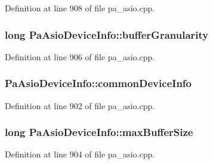 Definition at line 908 of file pa\+\_\+asio.\+cpp.

\subsubsection[{\texorpdfstring{buffer\+Granularity}{bufferGranularity}}]{\setlength{\rightskip}{0pt plus 5cm}long Pa\+Asio\+Device\+Info\+::buffer\+Granularity}\hypertarget{struct_pa_asio_device_info_aedeaec8c670140e8c366561eb0f2e39f}{}\label{struct_pa_asio_device_info_aedeaec8c670140e8c366561eb0f2e39f}


Definition at line 906 of file pa\+\_\+asio.\+cpp.

\subsubsection[{\texorpdfstring{common\+Device\+Info}{commonDeviceInfo}}]{ Pa\+Asio\+Device\+Info\+::common\+Device\+Info}\hypertarget{struct_pa_asio_device_info_ab882b243cb06587235f993247b5651e3}{}\label{struct_pa_asio_device_info_ab882b243cb06587235f993247b5651e3}


Definition at line 902 of file pa\+\_\+asio.\+cpp.

\subsubsection[{\texorpdfstring{max\+Buffer\+Size}{maxBufferSize}}]{\setlength{\rightskip}{0pt plus 5cm}long Pa\+Asio\+Device\+Info\+::max\+Buffer\+Size}\hypertarget{struct_pa_asio_device_info_a0cfad93025412e2f380df55321261a4f}{}\label{struct_pa_asio_device_info_a0cfad93025412e2f380df55321261a4f}


Definition at line 904 of file pa\+\_\+asio.\+cpp.

